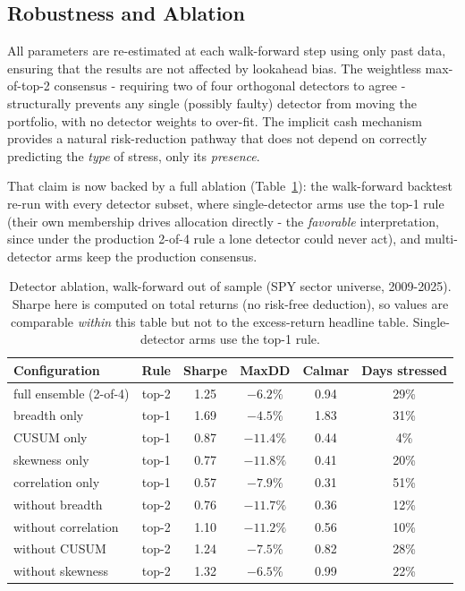 \documentclass[11pt]{article}
\begin{document}
\subsection{Robustness and Ablation}

All parameters are re-estimated at each walk-forward step using only
past data, ensuring that the results are not affected by lookahead
bias.  The weightless max-of-top-2 consensus - requiring two of four
orthogonal detectors to agree - structurally prevents any single
(possibly faulty) detector from moving the portfolio, with no detector
weights to over-fit.  The implicit cash mechanism provides a natural
risk-reduction pathway that does not depend on correctly predicting the
\emph{type} of stress, only its \emph{presence}.

That claim is now backed by a full ablation
(Table~\ref{tab:ablation}): the walk-forward backtest re-run with every
detector subset, where single-detector arms use the top-1 rule (their
own membership drives allocation directly - the \emph{favorable}
interpretation, since under the production 2-of-4 rule a lone detector
could never act), and multi-detector arms keep the production
consensus.

\begin{table}[t]
\centering
\small
\begin{tabular}{lccccc}
\toprule
\textbf{Configuration} & \textbf{Rule} & \textbf{Sharpe} & \textbf{MaxDD} & \textbf{Calmar} & \textbf{Days stressed} \\
\midrule
full ensemble (2-of-4) & top-2 & 1.25 & $-6.2\%$  & 0.94 & 29\% \\
\midrule
breadth only      & top-1 & 1.69 & $-4.5\%$  & 1.83 & 31\% \\
CUSUM only        & top-1 & 0.87 & $-11.4\%$ & 0.44 & 4\%  \\
skewness only     & top-1 & 0.77 & $-11.8\%$ & 0.41 & 20\% \\
correlation only  & top-1 & 0.57 & $-7.9\%$  & 0.31 & 51\% \\
\midrule
without breadth      & top-2 & 0.76 & $-11.7\%$ & 0.36 & 12\% \\
without correlation  & top-2 & 1.10 & $-11.2\%$ & 0.56 & 10\% \\
without CUSUM        & top-2 & 1.24 & $-7.5\%$  & 0.82 & 28\% \\
without skewness     & top-2 & 1.32 & $-6.5\%$  & 0.99 & 22\% \\
\bottomrule
\end{tabular}
\caption{Detector ablation, walk-forward out of sample (SPY sector
universe, 2009-2025). Sharpe here is computed on total returns (no
risk-free deduction), so values are comparable \emph{within} this table
but not to the excess-return headline table. Single-detector arms use
the top-1 rule.}
\label{tab:ablation}
\end{table}
\end{document}
